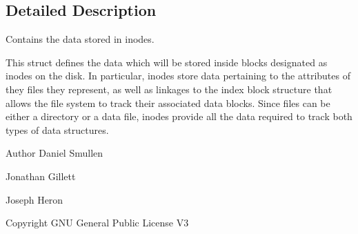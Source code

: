 \subsection{Detailed Description}
Contains the data stored in inodes. 

This struct defines the data which will be stored inside blocks designated as inodes on the disk. In particular, inodes store data pertaining to the attributes of they files they represent, as well as linkages to the index block structure that allows the file system to track their associated data blocks. Since files can be either a directory or a data file, inodes provide all the data required to track both types of data structures.

\begin{DoxyAuthor}{Author}
Daniel Smullen

Jonathan Gillett

Joseph Heron
\end{DoxyAuthor}
\begin{DoxyCopyright}{Copyright}
G\-N\-U General Public License V3 
\end{DoxyCopyright}


